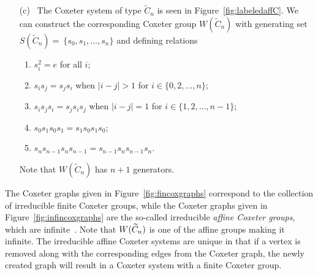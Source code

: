 \begin{example}
\begin{itemize}
\item[(c)~] The Coxeter system of type $\widetilde C_n$ is seen in Figure~\ref{fig:labeledaffC}. We can construct the corresponding Coxeter group $W(\widetilde C_n)$ with generating set $S(\widetilde{C}_n)=~\{s_0, s_1, \ldots ,s_n\}$ and defining relations 
\begin{enumerate}
	\item $s_i^2=e$ for all $i$;
	\item $s_is_j=s_js_i$ when $|i-j|>1$ for $i \in \{0,2, \ldots, n\}$;
	\item $s_is_js_i=s_js_is_j$ 	when $|i-j|=1$ for $i \in \{1,2, \ldots, n-1\}$;
	\item $s_0s_1s_0s_1=s_1s_0s_1s_0$;
	\item $s_ns_{n-1}s_ns_{n-1}=s_{n-1}s_ns_{n-1}s_n.$
\end{enumerate}
Note that $W(\widetilde{C}_n)$ has $n+1$ generators.
\end{itemize}
\end{example}



The Coxeter graphs given in Figure~\ref{fig:fincoxgraphs} correspond to the collection of irreducible finite Coxeter groups, while the Coxeter graphs given in Figure~\ref{fig:infincoxgraphs} are the so-called irreducible \emph{affine Coxeter groups}, which are infinite~\cite{Humphreys1990}. Note that $W(\widetilde{C}_n)$ is one of the affine groups making it infinite. The irreducible affine Coxeter systems are unique in that if a vertex is removed along with the corresponding edges from the Coxeter graph, the newly created graph will result in a Coxeter system with a finite Coxeter group. 

